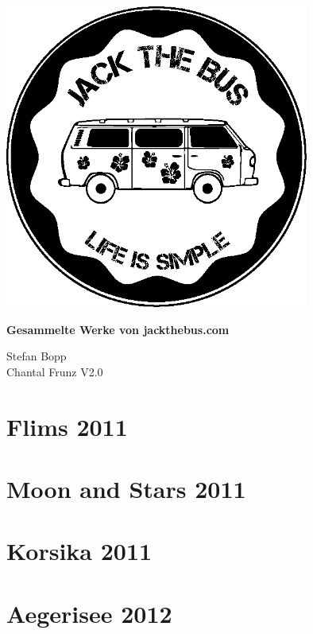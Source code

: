 \documentclass[11pt,nswissgerman]{article}
\begin{document}
\begin{titlepage}
\centering
\includegraphics[width=10cm]{../Bilder/Logo/Logo.png} \\
\vspace{2cm}
{\huge\bfseries Gesammelte Werke von jackthebus.com\par}
\vspace{2cm}
{\Large Stefan Bopp} \\
{\Large Chantal Frunz}
\vfill
{\large V2.0}
\thispagestyle{empty}

\end{titlepage}
\cleardoublepage
\newpage
\lhead{\leftmark}

\cfoot{\thepage}

\tableofcontents
\newpage
\section{Flims 2011}

\newpage
\section{Moon and Stars 2011}

\newpage
\section{Korsika 2011}

\newpage
\section{Aegerisee 2012}

\newpage
\end{document}
